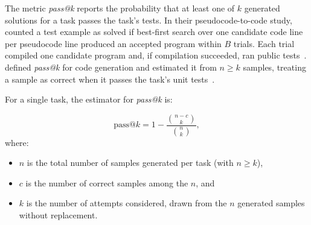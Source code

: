 The metric \emph{pass@k} reports the probability that at least one of $k$ generated solutions for a task passes the task's tests.
In their pseudocode-to-code study, \citeauthor{DBLP:conf/nips/KulalPC0PAL19} counted a test example as solved if best-first search over one candidate code line per pseudocode line produced an accepted program within $B$ trials.
Each trial compiled one candidate program and, if compilation succeeded, ran public tests~\cite{DBLP:conf/nips/KulalPC0PAL19}.
\citeauthor{DBLP:journals/corr/abs-2107-03374} defined \emph{pass@k} for code generation and estimated it from $n \ge k$ samples, treating a sample as correct when it passes the task's unit tests~\cite{DBLP:journals/corr/abs-2107-03374}.

For a single task, the estimator for \emph{pass@k} is:

\[
\text{pass@}k = 1 - \frac{\binom{n-c}{k}}{\binom{n}{k}},
\]
where:

\begin{itemize}
  \item $n$ is the total number of samples generated per task (with $n \ge k$),
  \item $c$ is the number of correct samples among the $n$, and
  \item $k$ is the number of attempts considered, drawn from the $n$ generated samples without replacement.
\end{itemize}


